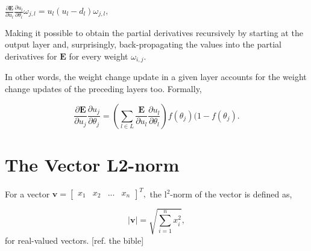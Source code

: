 \begin{center}
\begin{math}
    \frac{\partial \textbf{E}}{\partial u_l} \frac{\partial u_l}{\partial \theta_l} \omega_{j,l} = 
    u_l (u_l - d_l) \omega_{j,l},
\end{math}
\end{center}
Making it possible to obtain the partial derivatives recursively by starting at the output layer and, surprisingly, back-propagating the values into the partial derivatives for $\textbf{E}$ for every weight $\omega_{i,j}$.

In other words, the weight change update in a given layer accounts for the weight change updates of the preceding layers too. Formally,

\begin{equation}
    \frac{\partial \textbf{E}}{\partial u_j}\frac{\partial u_j}{\partial \theta_j} = 
    (\sum_{l \in L}\frac{\textbf{E}}{\partial u_l}\frac{\partial u_l}{\partial \theta_l}) f(\theta_j)(1-f(\theta_j).
\end{equation}

\section*{The Vector L2-norm}\label{l2-norm}

For a vector
\begin{math}
    \textbf{v} = \begin{bmatrix} x_1 & x_2 & ... & x_n
        \end{bmatrix}^T,
\end{math}
the l$^2$-norm of the vector is defined as,

\begin{equation}
    |\textbf{v}| = \sqrt{\sum_{i=1}^{n} x_i^2},
\end{equation}
for real-valued vectors. [ref. the bible]

\cleardoublepage